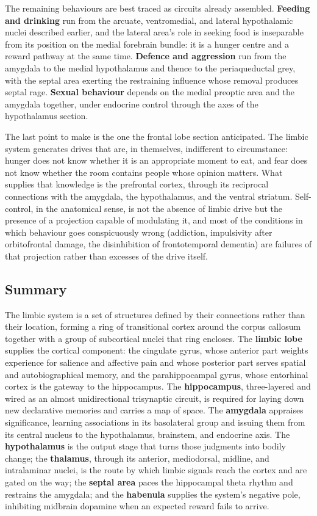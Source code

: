 \documentclass[11pt]{article}
\begin{document}
The remaining behaviours are best traced as circuits already assembled. \textbf{Feeding and drinking} run from the arcuate, ventromedial, and lateral hypothalamic nuclei described earlier, and the lateral area's role in seeking food is inseparable from its position on the medial forebrain bundle: it is a hunger centre and a reward pathway at the same time. \textbf{Defence and aggression} run from the amygdala to the medial hypothalamus and thence to the periaqueductal grey, with the septal area exerting the restraining influence whose removal produces septal rage. \textbf{Sexual behaviour} depends on the medial preoptic area and the amygdala together, under endocrine control through the axes of the hypothalamus section.

The last point to make is the one the frontal lobe section anticipated. The limbic system generates drives that are, in themselves, indifferent to circumstance: hunger does not know whether it is an appropriate moment to eat, and fear does not know whether the room contains people whose opinion matters. What supplies that knowledge is the prefrontal cortex, through its reciprocal connections with the amygdala, the hypothalamus, and the ventral striatum. Self-control, in the anatomical sense, is not the absence of limbic drive but the presence of a projection capable of modulating it, and most of the conditions in which behaviour goes conspicuously wrong (addiction, impulsivity after orbitofrontal damage, the disinhibition of frontotemporal dementia) are failures of that projection rather than excesses of the drive itself.

\subsection{Summary}

The limbic system is a set of structures defined by their connections rather than their location, forming a ring of transitional cortex around the corpus callosum together with a group of subcortical nuclei that ring encloses. The \textbf{limbic lobe} supplies the cortical component: the cingulate gyrus, whose anterior part weights experience for salience and affective pain and whose posterior part serves spatial and autobiographical memory, and the parahippocampal gyrus, whose entorhinal cortex is the gateway to the hippocampus. The \textbf{hippocampus}, three-layered and wired as an almost unidirectional trisynaptic circuit, is required for laying down new declarative memories and carries a map of space. The \textbf{amygdala} appraises significance, learning associations in its basolateral group and issuing them from its central nucleus to the hypothalamus, brainstem, and endocrine axis. The \textbf{hypothalamus} is the output stage that turns those judgments into bodily change; the \textbf{thalamus}, through its anterior, mediodorsal, midline, and intralaminar nuclei, is the route by which limbic signals reach the cortex and are gated on the way; the \textbf{septal area} paces the hippocampal theta rhythm and restrains the amygdala; and the \textbf{habenula} supplies the system's negative pole, inhibiting midbrain dopamine when an expected reward fails to arrive.
\end{document}
